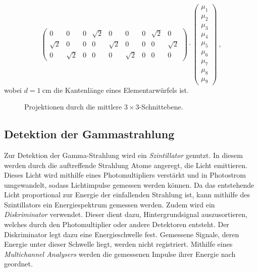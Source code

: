 \begin{equation}
\begin{pmatrix}
            0        & 0        & 0        & \sqrt{2} & 0        & 0        & 0        & \sqrt{2} & 0        \\
            \sqrt{2} & 0        & 0        & 0        & \sqrt{2} & 0        & 0        & 0        & \sqrt{2} \\
            0        & \sqrt{2} & 0        & 0        & 0        & \sqrt{2} & 0        & 0        & 0
        \end{pmatrix}
        \cdot
        \begin{pmatrix}
            \mu_1 \\
            \mu_2 \\
            \mu_3 \\
            \mu_4 \\
            \mu_5 \\
            \mu_6 \\
            \mu_7 \\
            \mu_8 \\
            \mu_9
        \end{pmatrix}
        \ ,
    \end{equation}
    wobei $d = \SI{1}{\centi\meter}$ die Kantenlänge eines Elementarwürfels ist.

    \begin{figure}
        \centering
        \caption{Projektionen durch die mittlere $3\times3$-Schnittebene.}
        \label{fig:theorie:projektionen}
    \end{figure}


\subsection{Detektion der Gammastrahlung}

    Zur Detektion der Gamma-Strahlung wird ein \textit{Szintillator} genutzt.
    In diesem werden durch die auftreffende Strahlung Atome angeregt,
    die Licht emittieren.
    Dieses Licht wird mithilfe eines Photomultipliers verstärkt und in Photostrom umgewandelt,
    sodass Lichtimpulse gemessen werden können.
    Da das entstehende Licht proportional zur Energie der einfallenden Strahlung ist,
    kann mithilfe des Szintillators ein Energiespektrum gemessen werden.
    Zudem wird ein \textit{Diskriminator} verwendet.
    Dieser dient dazu,
    Hintergrundsignal auszusortieren,
    welches durch den Photomultiplier oder andere Detektoren entsteht.
    Der Diskriminator legt dazu eine Energieschwelle fest.
    Gemessene Signale,
    deren Energie unter dieser Schwelle liegt,
    werden nicht registriert.
    Mithilfe eines \textit{Multichannel Analysers} werden die gemessenen Impulse ihrer Energie nach geordnet.
